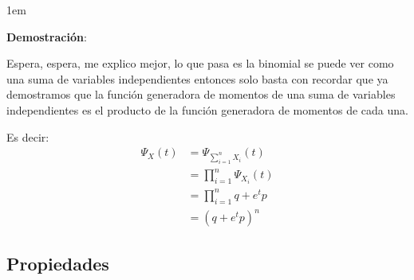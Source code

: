 \documentclass[12pt, fleqn]{report}                             %
\newenvironment{SmallIndentation}[1][0.75em]                    %
        {\begin{adjustwidth}{#1}{}\begin{footnotesize}}             %
        {\end{footnotesize}\end{adjustwidth}}                       %
\theoremstyle{break}                                            %
\newcommand{\Wrap}[1]{\left( #1 \right)}                        %
\begin{document}
                \begin{SmallIndentation}[1em]
                    \textbf{Demostración}:
                    
                    Espera, espera, me explico mejor, lo que pasa es la binomial se puede ver
                    como una suma de variables independientes entonces solo basta con recordar
                    que ya demostramos que la función generadora de momentos de una suma
                    de variables independientes es el producto de la función generadora
                    de momentos de cada una.

                    Es decir:
                    \begin{align*}
                        \Psi_X (t) 
                            &= \Psi_{\sum_{i=1}^n X_i} (t)      \\
                            &= \prod_{i = 1}^n \Psi_{X_i} (t)   \\
                            &= \prod_{i = 1}^n q + e^t p        \\
                            &= \Wrap{q + e^tp}^n                  
                    \end{align*} 

                \end{SmallIndentation}
                    
            
                    
                    
            \clearpage
            \subsection{Propiedades}
\end{document}
